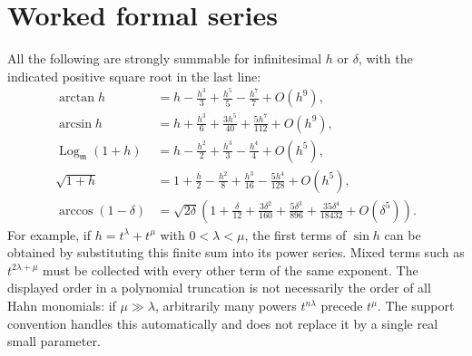 \documentclass[11pt]{article}
\numberwithin{equation}{section}
\theoremstyle{definition}
\newcommand{\mm}{\mathfrak m}
\newcommand{\Logm}{\operatorname{Log}_{\mm}}
\begin{document}
\section{Worked formal series}\label{app:series}
All the following are strongly summable for infinitesimal $h$ or $\delta$, with the indicated positive square root in the last line:
\begin{align*}
 \arctan h&=h-\frac{h^3}{3}+\frac{h^5}{5}-\frac{h^7}{7}+O(h^9),\\
 \arcsin h&=h+\frac{h^3}{6}+\frac{3h^5}{40}+\frac{5h^7}{112}+O(h^9),\\
 \Logm(1+h)&=h-\frac{h^2}{2}+\frac{h^3}{3}-\frac{h^4}{4}+O(h^5),\\
 \sqrt{1+h}&=1+\frac h2-\frac{h^2}{8}+\frac{h^3}{16}
               -\frac{5h^4}{128}+O(h^5),\\
 \arccos(1-\delta)&=\sqrt{2\delta}
 \left(1+\frac\delta{12}+\frac{3\delta^2}{160}
                 +\frac{5\delta^3}{896}+\frac{35\delta^4}{18432}
                 +O(\delta^5)\right).
\end{align*}
For example, if $h=t^\lambda+t^\mu$ with $0<\lambda<\mu$, the first terms of $\sin h$ can be obtained by substituting this finite sum into its power series. Mixed terms such as $t^{2\lambda+\mu}$ must be collected with every other term of the same exponent. The displayed order in a polynomial truncation is not necessarily the order of all Hahn monomials: if $\mu\gg\lambda$, arbitrarily many powers $t^{n\lambda}$ precede $t^\mu$. The support convention handles this automatically and does not replace it by a single real small parameter.
\end{document}
